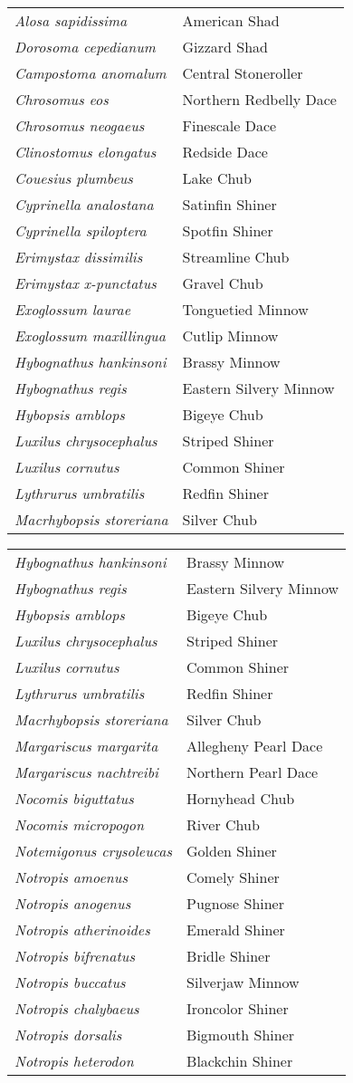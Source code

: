 \documentclass[11pt]{article}
\begin{document}
\vspace{\baselineskip}

%
\textbf{\Student}

\begin{tabular}{@{}L{3in}L{3in}@{}}
\textit{Alosa sapidissima} & American Shad\tabularnewline
\textit{Dorosoma cepedianum} & Gizzard Shad\tabularnewline
\textit{Campostoma anomalum} & Central Stoneroller\tabularnewline
\textit{Chrosomus eos} & Northern Redbelly Dace\tabularnewline
\textit{Chrosomus neogaeus} & Finescale Dace\tabularnewline
\textit{Clinostomus elongatus} & Redside Dace\tabularnewline
\textit{Couesius plumbeus} & Lake Chub\tabularnewline
\textit{Cyprinella analostana} & Satinfin Shiner\tabularnewline
\textit{Cyprinella spiloptera} & Spotfin Shiner\tabularnewline
\textit{Erimystax dissimilis} & Streamline Chub\tabularnewline
\textit{Erimystax x-punctatus} & Gravel Chub\tabularnewline
\textit{Exoglossum laurae} & Tonguetied Minnow\tabularnewline
\textit{Exoglossum maxillingua} & Cutlip Minnow\tabularnewline
\textit{Hybognathus hankinsoni} & Brassy Minnow\tabularnewline
\textit{Hybognathus regis} & Eastern Silvery Minnow\tabularnewline
\textit{Hybopsis amblops} & Bigeye Chub\tabularnewline
\textit{Luxilus chrysocephalus} & Striped Shiner\tabularnewline
\textit{Luxilus cornutus} & Common Shiner\tabularnewline
\textit{Lythrurus umbratilis} & Redfin Shiner\tabularnewline
\textit{Macrhybopsis storeriana} & Silver Chub\tabularnewline
\end{tabular}

\newpage

\vspace{\baselineskip}

%
\textbf{\Student}

\begin{tabular}{@{}L{3in}L{3in}@{}}
\textit{Hybognathus hankinsoni} & Brassy Minnow\tabularnewline
\textit{Hybognathus regis} & Eastern Silvery Minnow\tabularnewline
\textit{Hybopsis amblops} & Bigeye Chub\tabularnewline
\textit{Luxilus chrysocephalus} & Striped Shiner\tabularnewline
\textit{Luxilus cornutus} & Common Shiner\tabularnewline
\textit{Lythrurus umbratilis} & Redfin Shiner\tabularnewline
\textit{Macrhybopsis storeriana} & Silver Chub\tabularnewline
\textit{Margariscus margarita} & Allegheny Pearl Dace\tabularnewline
\textit{Margariscus nachtreibi} & Northern Pearl Dace\tabularnewline
\textit{Nocomis biguttatus} & Hornyhead Chub\tabularnewline
\textit{Nocomis micropogon} & River Chub\tabularnewline
\textit{Notemigonus crysoleucas} & Golden Shiner\tabularnewline
\textit{Notropis amoenus} & Comely Shiner\tabularnewline
\textit{Notropis anogenus} & Pugnose Shiner\tabularnewline
\textit{Notropis atherinoides} & Emerald Shiner\tabularnewline
\textit{Notropis bifrenatus} & Bridle Shiner\tabularnewline
\textit{Notropis buccatus} & Silverjaw Minnow\tabularnewline
\textit{Notropis chalybaeus} & Ironcolor Shiner\tabularnewline
\textit{Notropis dorsalis} & Bigmouth Shiner\tabularnewline
\textit{Notropis heterodon} & Blackchin Shiner\tabularnewline
\end{tabular}
\end{document}
